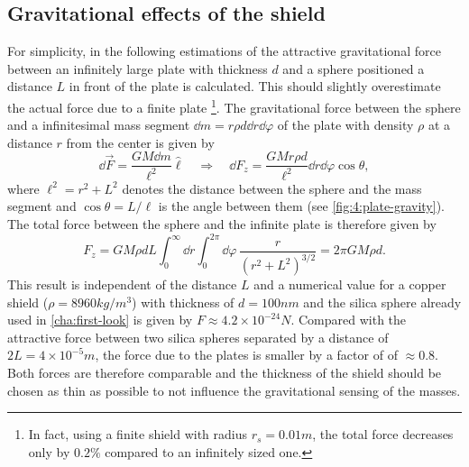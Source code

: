 \subsection{Gravitational effects of the shield}
For simplicity, in the following estimations of the attractive gravitational force between an infinitely large plate with thickness $d$ and a sphere positioned a distance $L$ in front of the plate is calculated. This should slightly overestimate the actual force due to a finite plate \footnote{In fact, using a finite shield with radius $r_s = 0.01\si{m}$, the total force decreases only by $0.2\%$ compared to an infinitely sized one.}.
The gravitational force between the sphere and a infinitesimal mass segment $\dd m = r \rho d \dd r\dd \varphi$ of the plate with density $\rho$ at a distance $r$ from the center is given by
\begin{equation}
  \dd \vec{F} = \frac{G M \dd m}{\ell^2} \boldsymbol{\hat{\ell}} 
  \quad \Rightarrow \quad
  \dd F_z = \frac{G M r \rho d}{\ell^2} \dd r \dd \varphi \cos \theta,
\end{equation}
where $\ell^2 = r^2 + L^2$ denotes the distance between the sphere and the mass segment and $\cos\theta = L/\ell$ is the angle between them (see \cref{fig:4:plate-gravity}).
The total force between the sphere and the infinite plate is therefore given by
\begin{equation}
  F_z = GM \rho d L \int_{0}^{\infty} \dd r \int_{0}^{2\pi} \dd \varphi \, \frac{r}{(r^2 + L^2)^{3/2}} = 2 \pi G M \rho d .
\end{equation}
This result is independent of the distance $L$ and a numerical value for a copper shield ($\rho = 8960\si{kg/m^3}$) with thickness of $d = 100\si{nm}$ and the silica sphere already used in \cref{cha:first-look} is given by $F \approx 4.2 \times 10^{-24}\si{N}$.
Compared with the attractive force between two silica spheres separated by a distance of $2L = 4\times 10^{-5}\si{m}$, the force due to the plates is smaller by a factor of of $\approx 0.8$.
Both forces are therefore comparable and the thickness of the shield should be chosen as thin as possible to not influence the gravitational sensing of the masses. 
